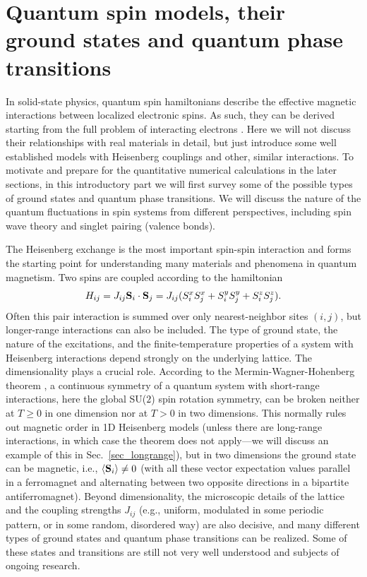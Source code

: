 \documentclass[draft,numberedheadings]{aipproc}
\begin{document}
\section{Quantum spin models, their ground states and quantum phase transitions}
\label{sec_heisenberg}

In solid-state physics, quantum spin hamiltonians describe the effective magnetic interactions between localized electronic spins. As such, they can be 
derived starting from the full problem of interacting electrons \cite{anderson,mattis,delannoy}. Here we will not discuss their relationships with real materials 
in detail, but just introduce some well established models with Heisenberg couplings and other, similar interactions. To motivate and prepare for the quantitative 
numerical calculations in the later sections, in this introductory part we will first survey some of the possible types of ground states and quantum phase 
transitions. We will discuss the nature of the quantum fluctuations in spin systems from different perspectives, including spin wave theory and singlet
pairing (valence bonds). 

The Heisenberg exchange is the most important spin-spin interaction and forms the starting point for understanding many materials and phenomena 
in quantum magnetism. Two spins are coupled according to the hamiltonian 
\begin{equation}
H_{ij}=J_{ij}{\bf S}_i \cdot {\bf S}_{j} = J_{ij}(S^x_iS^x_{j} + S^y_iS^y_{j} + S^z_iS^z_{j}).
\label{hamij1}
\end{equation}
Often this pair interaction is summed over only nearest-neighbor sites $(i,j)$, but longer-range interactions can also be included. The type of 
ground state, the nature of the excitations, and the finite-temperature properties of a system with Heisenberg interactions depend strongly on 
the underlying lattice. The dimensionality plays a crucial role. According to the Mermin-Wagner-Hohenberg theorem \cite{mermin,hohenberg}, a continuous 
symmetry of a quantum system with short-range interactions, here the global SU($2$) spin rotation symmetry, can be broken neither at $T \ge 0$ in 
one dimension nor at $T>0$ in two dimensions. This normally rules out magnetic order in 1D Heisenberg models (unless there are long-range interactions, 
in which case the theorem does not apply---we will discuss an example of this in Sec.~\ref{sec_longrange}), but in two dimensions the ground state 
can be magnetic, i.e., $\langle {\bf S}_i\rangle \not=0$ (with all these vector expectation values parallel in a ferromagnet and alternating between 
two opposite directions in a bipartite antiferromagnet). Beyond dimensionality, the microscopic details of the lattice and the coupling strengths $J_{ij}$ (e.g., 
uniform, modulated in some periodic pattern, or in some random, disordered way) are also decisive, and many different types of ground states and quantum
phase transitions can be realized. Some of these states and transitions are still not very well understood and subjects of ongoing research. 
\end{document}
